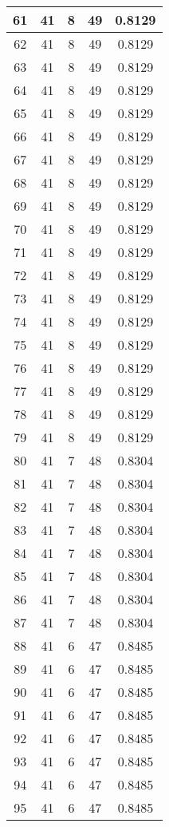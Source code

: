\documentclass[letterpaper, 12pt]{article}
\begin{document}
\begin{longtable}{|c|c|c|c|c|}
\hline
61 & 41 & 8 & 49 & 0.8129 \\
\hline
62 & 41 & 8 & 49 & 0.8129 \\
\hline
63 & 41 & 8 & 49 & 0.8129 \\
\hline
64 & 41 & 8 & 49 & 0.8129 \\
\hline
65 & 41 & 8 & 49 & 0.8129 \\
\hline
66 & 41 & 8 & 49 & 0.8129 \\
\hline
67 & 41 & 8 & 49 & 0.8129 \\
\hline
68 & 41 & 8 & 49 & 0.8129 \\
\hline
69 & 41 & 8 & 49 & 0.8129 \\
\hline
70 & 41 & 8 & 49 & 0.8129 \\
\hline
71 & 41 & 8 & 49 & 0.8129 \\
\hline
72 & 41 & 8 & 49 & 0.8129 \\
\hline
73 & 41 & 8 & 49 & 0.8129 \\
\hline
74 & 41 & 8 & 49 & 0.8129 \\
\hline
75 & 41 & 8 & 49 & 0.8129 \\
\hline
76 & 41 & 8 & 49 & 0.8129 \\
\hline
77 & 41 & 8 & 49 & 0.8129 \\
\hline
78 & 41 & 8 & 49 & 0.8129 \\
\hline
79 & 41 & 8 & 49 & 0.8129 \\
\hline
80 & 41 & 7 & 48 & 0.8304 \\
\hline
81 & 41 & 7 & 48 & 0.8304 \\
\hline
82 & 41 & 7 & 48 & 0.8304 \\
\hline
83 & 41 & 7 & 48 & 0.8304 \\
\hline
84 & 41 & 7 & 48 & 0.8304 \\
\hline
85 & 41 & 7 & 48 & 0.8304 \\
\hline
86 & 41 & 7 & 48 & 0.8304 \\
\hline
87 & 41 & 7 & 48 & 0.8304 \\
\hline
88 & 41 & 6 & 47 & 0.8485 \\
\hline
89 & 41 & 6 & 47 & 0.8485 \\
\hline
90 & 41 & 6 & 47 & 0.8485 \\
\hline
91 & 41 & 6 & 47 & 0.8485 \\
\hline
92 & 41 & 6 & 47 & 0.8485 \\
\hline
93 & 41 & 6 & 47 & 0.8485 \\
\hline
94 & 41 & 6 & 47 & 0.8485 \\
\hline
95 & 41 & 6 & 47 & 0.8485 \\

\end{longtable}
\end{document}
